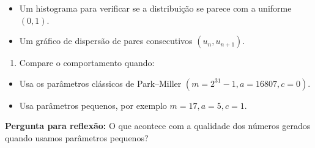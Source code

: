 \documentclass[
  letterpaper,
  DIV=11,
  numbers=noendperiod]{scrreprt}
\providecommand{\tightlist}{%
  \setlength{\itemsep}{0pt}\setlength{\parskip}{0pt}}\usepackage{longtable,booktabs,array}
\begin{document}
\begin{itemize}
\item
  Um histograma para verificar se a distribuição se parece com a
  uniforme \((0, 1)\).
\item
  Um gráfico de dispersão de pares consecutivos \((u_{n}, u_{n+1})\).
\end{itemize}

\begin{enumerate}
\def\labelenumi{\arabic{enumi}.}
\setcounter{enumi}{2}
\tightlist
\item
  Compare o comportamento quando:
\end{enumerate}

\begin{itemize}
\item
  Usa os parâmetros clássicos de Park--Miller
  \((m = 2^{31} - 1, a = 16807, c = 0)\).
\item
  Usa parâmetros pequenos, por exemplo \(m = 17, a = 5, c = 1\).
\end{itemize}

\textbf{Pergunta para reflexão:} O que acontece com a qualidade dos
números gerados quando usamos parâmetros pequenos?
\end{document}
